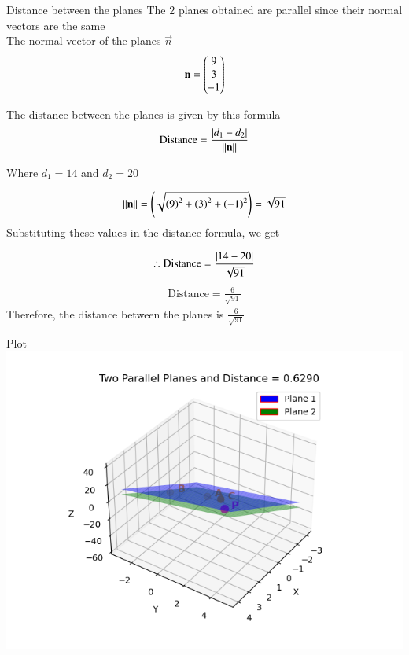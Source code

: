 \documentclass{beamer}
\begin{document}
\begin{frame}{Distance between the planes}
    The $2$ planes obtained are parallel since their normal vectors are the same\\
The normal vector of the planes $\vec{n}$
\begin{align}
\mathbf{n} = \begin{pmatrix}9 \\ 3 \\ -1\end{pmatrix}
\end{align}

The distance between the planes is given by this formula
\begin{align}
\text{Distance} = \frac{\left\vert d_1 - d_2\right\vert}{\left\lVert\mathbf{n}\right\rVert}
\end{align}

Where $d_1 = 14$ and $d_2 = 20$

\begin{align}
{\left\lVert\mathbf{n}\right\rVert} = \left(\sqrt{\left(9\right)^2 + \left(3\right)^2 + \left(-1\right)^2}\right) = \sqrt{91}
\end{align}
Substituting these values in the distance formula, we get
\end{frame}
\begin{frame}
    \begin{align}
\therefore \text{Distance} = \frac{\left\vert14-20\right\vert}{\sqrt{91}}
\end{align}
\begin{align}
\text{Distance} = \frac{6}{\sqrt{91}}
\end{align}
Therefore, the distance between the planes is $\frac{6}{\sqrt{91}}$
\end{frame}

\begin{frame}{Plot}
    \centering
    \includegraphics[width=3\columnwidth, height=0.8\textheight, keepaspectratio]{figs/fig.png}     
\end{frame}
\end{document}
